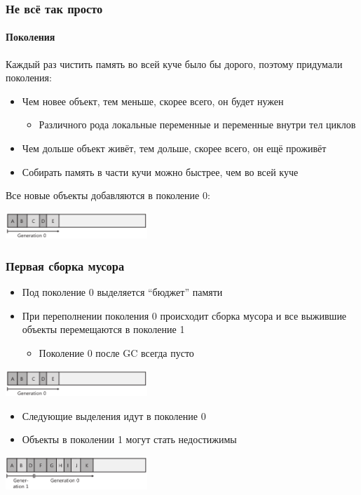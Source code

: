 \documentclass{../../slides-style}
\begin{document}
    \begin{frame}
        \frametitle{Не всё так просто}
        \framesubtitle{Поколения}
        Каждый раз чистить память во всей куче было бы дорого, поэтому придумали поколения:
        \begin{itemize}
            \item Чем новее объект, тем меньше, скорее всего, он будет нужен
            \begin{itemize}
                \item Различного рода локальные переменные и переменные внутри тел циклов
            \end{itemize}
            \item Чем дольше объект живёт, тем дольше, скорее всего, он ещё проживёт
            \item Собирать память в части кучи можно быстрее, чем во всей куче
        \end{itemize}
        Все новые объекты добавляются в поколение 0:
        \begin{center}
            \includegraphics[width=0.4\textwidth]{generation0.png}
        \end{center}
    \end{frame}

    \begin{frame}
        \frametitle{Первая сборка мусора}
        \begin{itemize}
            \item Под поколение 0 выделяется ``бюджет'' памяти
            \item При переполнении поколения 0 происходит сборка мусора и все выжившие объекты перемещаются в поколение 1
            \begin{itemize}
                \item Поколение 0 после GC всегда пусто
            \end{itemize}
        \end{itemize}
        \begin{center}
            \includegraphics[width=0.4\textwidth]{generation0.png}
        \end{center}
        \begin{itemize}
            \item Следующие выделения идут в поколение 0
            \item Объекты в поколении 1 могут стать недостижимы
        \end{itemize}
        \begin{center}
            \includegraphics[width=0.4\textwidth]{generation1.png}
        \end{center}
    \end{frame}
\end{document}
